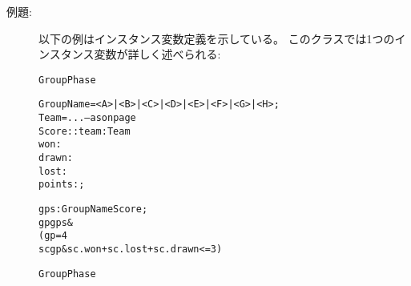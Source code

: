 \documentclass[\pformat,12pt]{jarticle}
\begin{document}
\begin{description}
\item[例題:]

以下の例はインスタンス変数定義を示している。
このクラスでは1つのインスタンス変数が詳しく述べられる: 
  \begin{alltt}
   GroupPhase


    GroupName = <A> | <B> | <C> | <D> | <E> | <F> | <G> | <H>;
    Team = ... -- as on page \pageref{scoredef}
    Score::team : Team
           won : 
           drawn : 
           lost : 
           points : ;


    gps :  GroupName  Score;
   gp  gps & 
        ( gp = 4 
          sc  gp & sc.won + sc.lost + sc.drawn <= 3)

   GroupPhase
  \end{alltt}


\end{description}
\end{document}
